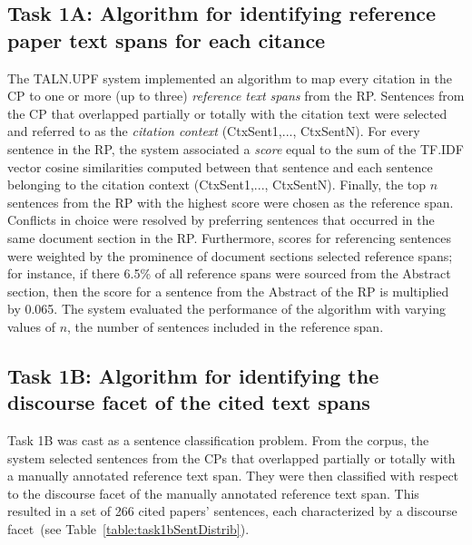 \documentclass[11pt]{article}
\begin{document}
\subsection{Task 1A: Algorithm for identifying reference paper 
  text spans for each citance}
The TALN.UPF system implemented an algorithm to 
map every citation in the CP to one or more (up to three) 
\textit{reference text spans} from the RP. Sentences from the CP 
that overlapped partially or totally with the citation text were 
selected and referred to as the \textit{citation context} 
(CtxSent1,..., CtxSentN). For every sentence in the RP, the system 
associated a \textit{score} equal to the sum of the TF.IDF vector 
cosine similarities computed between that sentence and each sentence 
belonging to the citation context (CtxSent1,..., CtxSentN). Finally, 
the top $n$ sentences from the RP with the highest score were
chosen as the reference span. Conflicts in choice were resolved by 
preferring sentences that occurred in the same document section in 
the RP.
Furthermore, scores for referencing sentences were weighted 
by the prominence of document sections selected reference spans; 
for instance, if there 6.5\% of all reference spans were sourced from the
Abstract section, then the score for a sentence from the Abstract 
of the RP is multiplied by 0.065. The system evaluated the performance 
of the algorithm with varying values of $n$, the number of sentences 
included in the reference span.

\subsection{Task 1B: Algorithm for identifying the discourse facet 
  of the cited text spans}
Task 1B was cast as a sentence classification problem. From the 
corpus, the system selected sentences from the CPs that overlapped 
partially or totally with a manually annotated reference text span.
They were then classified with respect to the discourse facet of the manually 
annotated reference text span. This resulted in a set of 266 cited 
papers' sentences, each characterized by a discourse 
facet~(see Table~\ref{table:task1bSentDistrib}).
\end{document}
